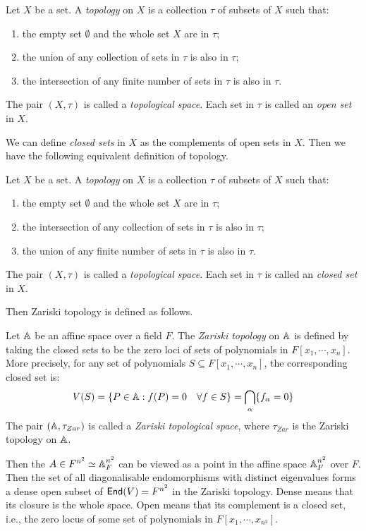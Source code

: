 \begin{definition*}[Topology]
  Let $X$ be a set. A \emph{topology} on $X$ is a collection $\tau$ of subsets of $X$ such that:
  \begin{enumerate}
    \item the empty set $\emptyset$ and the whole set $X$ are in $\tau$;
    \item the union of any collection of sets in $\tau$ is also in $\tau$;
    \item the intersection of any finite number of sets in $\tau$ is also in $\tau$.
  \end{enumerate}
  The pair $(X, \tau)$ is called a \emph{topological space}. Each set in $\tau$ is called an \emph{open set} in $X$.
\end{definition*}
We can define \emph{closed sets} in $X$ as the complements of open sets in $X$. Then we have the following equivalent definition of topology.
\begin{definition*}
  Let $X$ be a set. A \emph{topology} on $X$ is a collection $\tau$ of subsets of $X$ such that:
  \begin{enumerate}
    \item the empty set $\emptyset$ and the whole set $X$ are in $\tau$;
    \item the intersection of any collection of sets in $\tau$ is also in $\tau$;
    \item the union of any finite number of sets in $\tau$ is also in $\tau$.
  \end{enumerate}
  The pair $(X, \tau)$ is called a \emph{topological space}. Each set in $\tau$ is called an \emph{closed set} in $X$.
\end{definition*}

Then Zariski topology is defined as follows.
\begin{definition*}
  Let $\operatorname{\mathbb{A}}$ be an affine space over a field $F$. The \emph{Zariski topology} on $\operatorname{\mathbb{A}}$ is defined by taking the closed sets to be the zero loci of sets of polynomials in $F[x_1, \cdots, x_n]$. More precisely, for any set of polynomials $S \subseteq F[x_1, \cdots, x_n]$, the corresponding closed set is:
  \[
    V(S) = \{ P \in \operatorname{\mathbb{A}} : f(P) = 0 \quad \forall f \in S \} = \bigcap_{\alpha} \{ f_\alpha = 0 \}
  \]
  The pair $(\operatorname{\mathbb{A}}, \tau_{Zar})$ is called a \emph{Zariski topological space}, where $\tau_{Zar}$ is the Zariski topology on $\operatorname{\mathbb{A}}$.
\end{definition*}

Then the $A \in F^{n^2} \simeq \operatorname{\mathbb{A}}_{F}^{n^2}$ can be viewed as a point in the affine space $\operatorname{\mathbb{A}}_{F}^{n^2}$ over $F$. Then the set of all diagonalisable endomorphisms with distinct eigenvalues forms a dense open subset of $\operatorname{\text{\normalfont\sffamily End}}(V) = F^{n^2}$ in the Zariski topology. Dense means that its closure is the whole space. Open means that its complement is a closed set, i.e., the zero locus of some set of polynomials in $F[x_1, \cdots, x_{n^2}]$.
